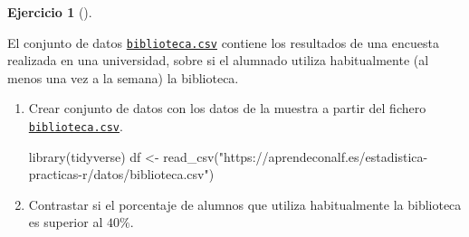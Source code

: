 \documentclass[
  a4paper,
]{scrreport}
\newenvironment{Shaded}{\begin{snugshade}}{\end{snugshade}}
\newcommand{\FunctionTok}[1]{\textcolor[rgb]{0.28,0.35,0.67}{#1}}
\newcommand{\NormalTok}[1]{\textcolor[rgb]{0.00,0.23,0.31}{#1}}
\newcommand{\OtherTok}[1]{\textcolor[rgb]{0.00,0.23,0.31}{#1}}
\newcommand{\StringTok}[1]{\textcolor[rgb]{0.13,0.47,0.30}{#1}}
\theoremstyle{definition}
\newtheorem{exercise}{Ejercicio}[chapter]
\theoremstyle{remark}
\begin{document}
\begin{exercise}[]\protect\hypertarget{exr-contraste-hipotesis-proporcion-uso-biblioteca}{}\label{exr-contraste-hipotesis-proporcion-uso-biblioteca}

El conjunto de datos
\href{https://aprendeconalf.es/estadistica-practicas-r/datos/biblioteca.csv}{\texttt{biblioteca.csv}}
contiene los resultados de una encuesta realizada en una universidad,
sobre si el alumnado utiliza habitualmente (al menos una vez a la
semana) la biblioteca.

\begin{enumerate}
\def\labelenumi{\alph{enumi}.}
\item
  Crear conjunto de datos con los datos de la muestra a partir del
  fichero
  \href{https://aprendeconalf.es/estadistica-practicas-r/datos/biblioteca.csv}{\texttt{biblioteca.csv}}.

  \begin{tcolorbox}[enhanced jigsaw, breakable, toptitle=1mm, colbacktitle=quarto-callout-tip-color!10!white, rightrule=.15mm, opacityback=0, opacitybacktitle=0.6, titlerule=0mm, coltitle=black, colframe=quarto-callout-tip-color-frame, colback=white, bottomtitle=1mm, leftrule=.75mm, toprule=.15mm, title=\textcolor{quarto-callout-tip-color}{\faLightbulb}\hspace{0.5em}{Solución}, arc=.35mm, bottomrule=.15mm, left=2mm]

\begin{Shaded}
\begin{Highlighting}[]
\FunctionTok{library}\NormalTok{(tidyverse)}
\NormalTok{df }\OtherTok{\textless{}{-}} \FunctionTok{read\_csv}\NormalTok{(}\StringTok{"https://aprendeconalf.es/estadistica{-}practicas{-}r/datos/biblioteca.csv"}\NormalTok{)}
\end{Highlighting}
\end{Shaded}

  \end{tcolorbox}
\item
  Contrastar si el porcentaje de alumnos que utiliza habitualmente la
  biblioteca es superior al \(40\%\).

  \begin{tcolorbox}[enhanced jigsaw, breakable, toptitle=1mm, colbacktitle=quarto-callout-note-color!10!white, rightrule=.15mm, opacityback=0, opacitybacktitle=0.6, titlerule=0mm, coltitle=black, colframe=quarto-callout-note-color-frame, colback=white, bottomtitle=1mm, leftrule=.75mm, toprule=.15mm, title=\textcolor{quarto-callout-note-color}{\faInfo}\hspace{0.5em}{Ayuda}, arc=.35mm, bottomrule=.15mm, left=2mm]


\end{tcolorbox}
\end{enumerate}
\end{exercise}
\end{document}
